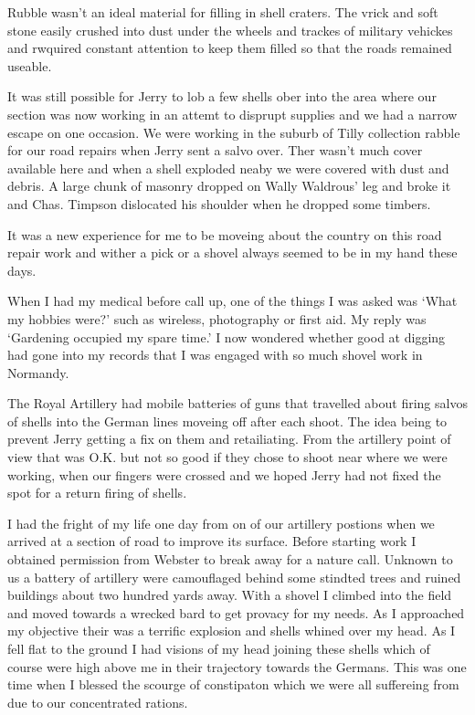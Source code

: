 Rubble wasn't an ideal material for filling in shell craters. The
vrick and soft stone easily crushed into dust under the wheels and
trackes of military vehickes and rwquired constant attention to keep
them filled so that the roads remained useable.

It was still possible for Jerry to lob a few shells ober into the area
where our section was now working in an attemt to disprupt supplies
and we had a narrow escape on one occasion. We were working in the
suburb of Tilly collection rabble for our road repairs when Jerry sent
a salvo over. Ther wasn't much cover available here and when a shell
exploded neaby we were covered with dust and debris. A large chunk of
masonry dropped on Wally Waldrous' leg and broke it and Chas. Timpson
dislocated his shoulder when he dropped some timbers.

It was a new experience for me to be moveing about the country on this
road repair work and wither a pick or a shovel always seemed to be in
my hand these days.

When I had my medical before call up, one of the things I was asked
was `What my hobbies were?' such as wireless, photography or first
aid. My reply was `Gardening occupied my spare time.' I now wondered
whether good at digging had gone into my records that I was engaged
with so much shovel work in Normandy.

The Royal Artillery had mobile batteries of guns that travelled about
firing salvos of shells into the German lines moveing off after each
shoot. The idea being to prevent Jerry getting a fix on them and
retailiating. From the artillery point of view that was O.K. but not
so good if they chose to shoot near where we were working, when our
fingers were crossed and we hoped Jerry had not fixed the spot for a
return firing of shells.

I had the fright of my life one day from on of our artillery postions
when we arrived at a section of road to improve its surface. Before
starting work I obtained permission from \lsergeant Webster to break away
for a nature call. Unknown to us a battery of artillery were
camouflaged behind some stindted trees and ruined buildings about two
hundred yards away. With a shovel I climbed into the field and moved
towards a wrecked bard to get provacy for my needs. As I approached my
objective their was a terrific explosion and shells whined over my
head. As I fell flat to the ground I had visions of my head joining
these shells which of course were high above me in their trajectory
towards the Germans. This was one time when I blessed the scourge of
constipaton which we were all suffereing from due to our concentrated
rations.

